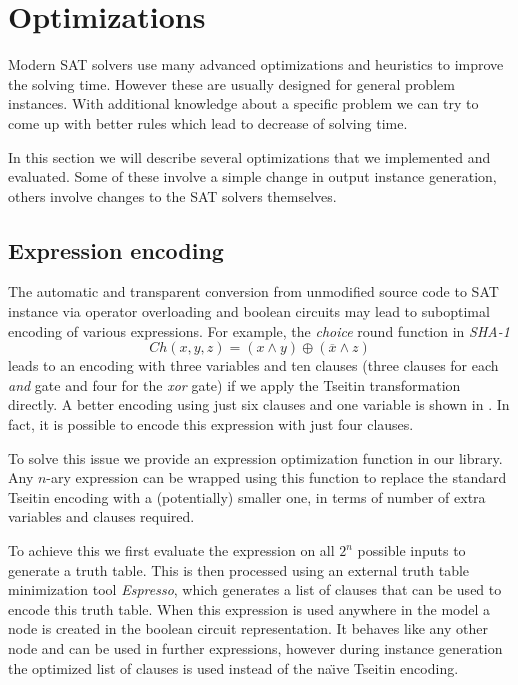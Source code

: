 \section{Optimizations}

Modern SAT solvers use many advanced optimizations and heuristics to improve the solving time.
However these are usually designed for general problem instances.
With additional knowledge about a specific problem we can try to come up with better rules which lead to decrease of solving time.

In this section we will describe several optimizations that we implemented and evaluated.
Some of these involve a simple change in output instance generation, others involve changes to the SAT solvers themselves.


\subsection{Expression encoding}
The automatic and transparent conversion from unmodified source code to SAT instance via operator overloading and boolean circuits may lead to suboptimal encoding of various expressions.
For example, the \emph{choice} round function in \emph{SHA-1}
\[
Ch(x, y, z) = (x \land y) \oplus (\overline{x} \land z)
\]
leads to an encoding with three variables and ten clauses (three clauses for each \emph{and} gate and four for the \emph{xor} gate) if we apply the Tseitin transformation directly.
A better encoding using just six clauses and one variable is shown in \cite{nossum2012sat}.
In fact, it is possible to encode this expression with just four clauses.

To solve this issue we provide an expression optimization function in our library.
Any $n$-ary expression can be wrapped using this function to replace the standard Tseitin encoding with a (potentially) smaller one, in terms of number of extra variables and clauses required.

To achieve this we first evaluate the expression on all $2^n$ possible inputs to generate a truth table.
This is then processed using an external truth table minimization tool \emph{Espresso}, which generates a list of clauses that can be used to encode this truth table.
When this expression is used anywhere in the model a node is created in the boolean circuit representation.
It behaves like any other node and can be used in further expressions, however during instance generation the optimized list of clauses is used instead of the na\"{\i}ve Tseitin encoding.

